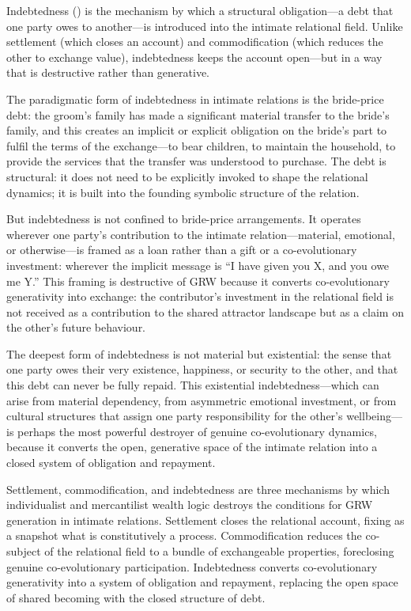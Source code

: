 \noindent
Indebtedness () is the mechanism by which a structural obligation---a debt that one party owes to another---is introduced into the intimate relational field. Unlike settlement (which closes an account) and commodification (which reduces the other to exchange value), indebtedness keeps the account open---but in a way that is destructive rather than generative.

The paradigmatic form of indebtedness in intimate relations is the bride-price debt: the groom's family has made a significant material transfer to the bride's family, and this creates an implicit or explicit obligation on the bride's part to fulfil the terms of the exchange---to bear children, to maintain the household, to provide the services that the transfer was understood to purchase. The debt is structural: it does not need to be explicitly invoked to shape the relational dynamics; it is built into the founding symbolic structure of the relation.

But indebtedness is not confined to bride-price arrangements. It operates wherever one party's contribution to the intimate relation---material, emotional, or otherwise---is framed as a loan rather than a gift or a co-evolutionary investment: wherever the implicit message is ``I have given you X, and you owe me Y.'' This framing is destructive of GRW because it converts co-evolutionary generativity into exchange: the contributor's investment in the relational field is not received as a contribution to the shared attractor landscape but as a claim on the other's future behaviour.

The deepest form of indebtedness is not material but existential: the sense that one party owes their very existence, happiness, or security to the other, and that this debt can never be fully repaid. This existential indebtedness---which can arise from material dependency, from asymmetric emotional investment, or from cultural structures that assign one party responsibility for the other's wellbeing---is perhaps the most powerful destroyer of genuine co-evolutionary dynamics, because it converts the open, generative space of the intimate relation into a closed system of obligation and repayment.

\begin{claim}
Settlement, commodification, and indebtedness are three mechanisms by which individualist and mercantilist wealth logic destroys the conditions for GRW generation in intimate relations. Settlement closes the relational account, fixing as a snapshot what is constitutively a process. Commodification reduces the co-subject of the relational field to a bundle of exchangeable properties, foreclosing genuine co-evolutionary participation. Indebtedness converts co-evolutionary generativity into a system of obligation and repayment, replacing the open space of shared becoming with the closed structure of debt.
\end{claim}

